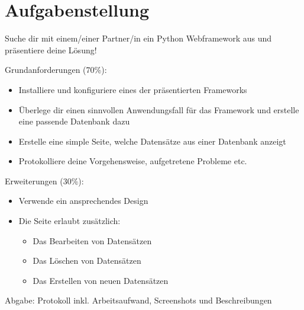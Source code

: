 
\section{Aufgabenstellung}

Suche dir mit einem/einer Partner/in ein Python Webframework aus und präsentiere deine Lösung!

Grundanforderungen (70\%):
\begin{itemize}
	\item Installiere und konfiguriere eines der präsentierten Frameworks
	\item Überlege dir einen sinnvollen Anwendungsfall für das Framework und erstelle eine passende Datenbank dazu
	\item Erstelle eine simple Seite, welche Datensätze aus einer Datenbank anzeigt
	\item Protokolliere deine Vorgehensweise, aufgetretene Probleme etc.

\end{itemize}
Erweiterungen (30\%):
\begin{itemize}
	\item Verwende ein ansprechendes Design
	\item Die Seite erlaubt zusätzlich: 
	\begin{itemize}
		\item Das Bearbeiten von Datensätzen
		\item Das Löschen von Datensätzen
		\item Das Erstellen von neuen Datensätzen
	\end{itemize}
\end{itemize}
Abgabe: Protokoll inkl. Arbeitsaufwand, Screenshots und Beschreibungen
\clearpage

